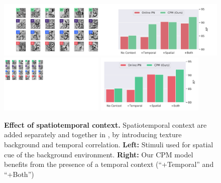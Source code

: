 \begin{figure}[t]
\vspace{-0.1in}
\centering
\iflatexml
    \includegraphics[width=6\linewidth]{figures/spatiotemporal_full.png}
\else
    \includegraphics[height=2.8cm,trim={-2.25cm 10cm 20cm 0.5cm},clip]{figures/omniglot-texture.pdf}
    \includegraphics[height=2.8cm,trim={-2.25cm 0 0.5cm 0},clip]{figures/spatiotemporal.pdf}
\fi
\quad
\vspace{-0.2in}
\caption{\textbf{Effect of spatiotemporal context.} Spatiotemporal
context are added separately and together in \ourchar{}, by introducing texture background and
temporal correlation. \textbf{Left:} Stimuli used for spatial cue of the background environment.
\textbf{Right:} Our CPM model benefits from the presence of a temporal context
(``+Temporal'' and ``+Both'')} %
\label{fig:spatiotemporal}
\end{figure}
